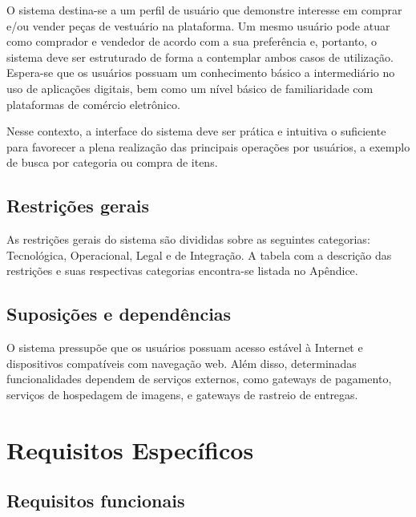 \documentclass[
	article,			%
	11pt,				%
	oneside,			%
	a4paper,			%
	english,			%
	brazil,				%
	sumario=tradicional
	]{abntex2}
\begin{document}
O sistema destina-se a um perfil de usuário que demonstre interesse em comprar e/ou vender peças de vestuário na plataforma. Um mesmo usuário pode atuar como comprador e vendedor de acordo com a sua preferência e, portanto, o sistema deve ser estruturado de forma a contemplar ambos casos de utilização. Espera-se que os usuários possuam um conhecimento básico a intermediário no uso de aplicações digitais, bem como um nível básico de familiaridade com plataformas de comércio eletrônico.

Nesse contexto, a interface do sistema deve ser prática e intuitiva o suficiente para favorecer a plena realização das principais operações por usuários, a exemplo de busca por categoria ou compra de itens.

\subsection{Restrições gerais}
\label{RestricoesGeral}
As restrições gerais do sistema são divididas sobre as seguintes categorias: Tecnológica, Operacional, Legal e de Integração. A tabela com a descrição das restrições e suas respectivas categorias encontra-se listada no Apêndice.

\subsection{Suposições e dependências}
\label{sec:Suposicoes}

O sistema pressupõe que os usuários possuam acesso estável à Internet e dispositivos compatíveis com navegação web. Além disso, determinadas funcionalidades dependem de serviços externos, como gateways de pagamento, serviços de hospedagem de imagens, e gateways de rastreio de entregas.

\section{Requisitos Específicos}
\label{RequisitosEspecificos}

\subsection{Requisitos funcionais}
\label{RequisitosFuncionais}
\end{document}
